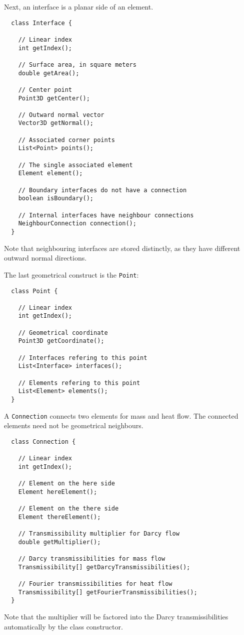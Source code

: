 Next, an interface is a planar side of an element.
\begin{lstlisting}
  class Interface {

    // Linear index
    int getIndex();

    // Surface area, in square meters
    double getArea();

    // Center point
    Point3D getCenter();

    // Outward normal vector
    Vector3D getNormal();

    // Associated corner points
    List<Point> points();

    // The single associated element
    Element element();

    // Boundary interfaces do not have a connection
    boolean isBoundary();

    // Internal interfaces have neighbour connections
    NeighbourConnection connection();
  }
\end{lstlisting}
Note that neighbouring interfaces are stored distinctly, as they have
different outward normal directions.

The last geometrical construct is the \texttt{Point}:
\begin{lstlisting}
  class Point {

    // Linear index
    int getIndex();

    // Geometrical coordinate
    Point3D getCoordinate();

    // Interfaces refering to this point
    List<Interface> interfaces();

    // Elements refering to this point
    List<Element> elements();
  }
\end{lstlisting}



A \texttt{Connection} connects two elements for mass and heat
flow. The connected elements need not be geometrical neighbours.
\begin{lstlisting}
  class Connection {

    // Linear index
    int getIndex();

    // Element on the here side
    Element hereElement();

    // Element on the there side
    Element thereElement();

    // Transmissibility multiplier for Darcy flow
    double getMultiplier();

    // Darcy transmissibilities for mass flow
    Transmissibility[] getDarcyTransmissibilities();

    // Fourier transmissibilities for heat flow
    Transmissibility[] getFourierTransmissibilities();
  }
\end{lstlisting}
Note that the multiplier will be factored into the Darcy
transmissibilities automatically by the class constructor.

